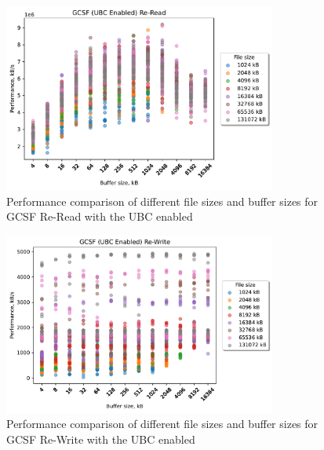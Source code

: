 \begin{figure}[!htb]
	\label{fig:bench_gcsf_ubc_scatter_re-read}
	\begin{center}
		\includegraphics[width=0.8\textwidth]{figures.nosync/benchmarking/GCSF/scatter-UBC Enabled-Re-Read.pdf}
	\end{center}
	\caption[Comparison of Re-Read performance for file size and buffer size for GCSF with the UBC enabled]{Performance comparison of different file sizes and buffer sizes for GCSF Re-Read with the UBC enabled}
\end{figure}
\begin{figure}[!htb]
	\label{fig:bench_gcsf_ubc_scatter_re-write}
	\begin{center}
		\includegraphics[width=0.8\textwidth]{figures.nosync/benchmarking/GCSF/scatter-UBC Enabled-Re-Write.pdf}
	\end{center}
	\caption[Comparison of Re-Write performance for file size and buffer size for GCSF with the UBC enabled]{Performance comparison of different file sizes and buffer sizes for GCSF Re-Write with the UBC enabled}
\end{figure}
\clearpage
